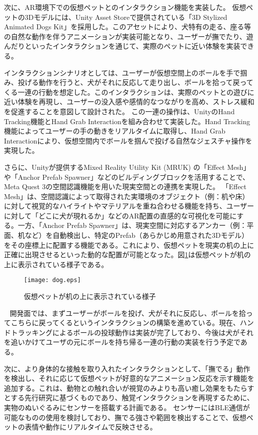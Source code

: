 \documentclass[a4j]{ltjsarticle}
\newcounter{seccnt}
\newcommand{\usection}[1]{\ \newline{\bf\underline{\theseccnt\stepcounter{seccnt}. #1}\hspace{10pt}}}
\begin{document}
次に、AR環境下での仮想ペットとのインタラクション機能を実装した。
仮想ペットの3Dモデルには、Unity Asset Storeで提供されている「3D Stylized Animated Dogs Kit」を採用した。このアセットにより、犬特有の走る、座る等の自然な動作を伴うアニメーションが実装可能となり、ユーザーが撫でたり、遊んだりといったインタラクションを通じて、実際のペットに近い体験を実装できる。

インタラクションシナリオとしては、ユーザーが仮想空間上のボールを手で掴み、投げる動作を行うと、犬がそれに反応して走り出し、ボールを拾って戻ってくる一連の行動を想定した。このインタラクションは、実際のペットとの遊びに近い体験を再現し、ユーザーの没入感や感情的なつながりを高め、ストレス緩和を促進することを意図して設計された。
この一連の操作は、UnityのHand Tracking機能とHand Grab Interactionを組み合わせて実装した。Hand Tracking機能によってユーザーの手の動きをリアルタイムに取得し、Hand Grab Interactionにより、仮想空間内でボールを掴んで投げる自然なジェスチャ操作を実現した。

さらに、Unityが提供するMixed Reality Utility Kit (MRUK) の「Effect Mesh」や「Anchor Prefab Spawner」などのビルディングブロックを活用することで、Meta Quest 3の空間認識機能を用いた現実空間との連携を実現した。
「Effect Mesh」は、空間認識によって取得された実環境のオブジェクト（例：机や床）に対して視覚的なハイライトやマテリアルを重ね合わせる機能を持ち、ユーザーに対して「どこに犬が現れるか」などのAR配置の直感的な可視化を可能にする。一方、「Anchor Prefab Spawner」は、現実空間に対応するアンカー（例：平面、机など）を自動検出し、特定のPrefab（あらかじめ用意された3Dモデル）をその座標上に配置する機能である。これにより、仮想ペットを現実の机の上に正確に出現させるといった動的な配置が可能となった。図\ref{fig:dog}は仮想ペットが机の上に表示されている様子である。

\begin{figure}[b]
  \centering
  \texttt{[image: dog.eps]}
  \caption{仮想ペットが机の上に表示されている様子}
  \label{fig:dog}
\end{figure}


\usection{今後の計画}
開発面では、まずユーザーがボールを投げ、犬がそれに反応し、ボールを拾ってこちらに戻ってくるというインタラクションの構築を進めている。現在、ハンドトラッキングによるボールの投球動作は実装が完了しており、今後は犬がそれを追いかけてユーザの元にボールを持ち帰る一連の行動の実装を行う予定である。

次に、より身体的な接触を取り入れたインタラクションとして、「撫でる」動作を検出し、それに応じて仮想ペットが好意的なアニメーション反応を示す機能を追加する。これは、動物との触れ合いが視覚のみよりも高い癒し効果をもたらすとする先行研究\cite{3}に基づくものであり、触覚インタラクションを再現するために、実物のぬいぐるみにセンサーを搭載する計画である。
センサーにはBLE通信が可能なものの使用を検討しており、撫でる強さや範囲を検出することで、仮想ペットの表情や動作にリアルタイムで反映させる。
\end{document}
